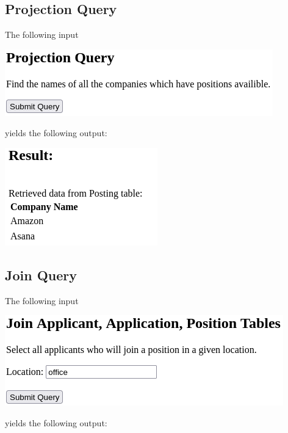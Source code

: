\newpage

\subsection{Projection Query}

The following input

\includegraphics[width=0.5\linewidth]{src/6/2022-03-30-174835_439x109_scrot.png}

yields the following output:

\includegraphics[width=\linewidth]{src/6/2022-03-30-174841_250x160_scrot.png}

\newpage

\subsection{Join Query}

The following input

\includegraphics[width=0.5\linewidth]{src/6/2022-03-30-180420_456x148_scrot.png}

yields the following output:

